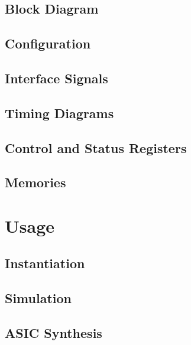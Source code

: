 \documentclass{ug}
\begin{document}
\subsection{Block Diagram}
\label{sec:bdd}


\ifdefined\CONFS
\subsection{Configuration}
\label{sec:ipconfig}

\fi

\subsection{Interface Signals}
\label{sec:ifsig}


\ifdefined\TD
\subsection{Timing Diagrams}
\label{sec:td}

\fi

\ifdefined\CSRS
\subsection{Control and Status Registers}
\label{sec:csrs}

\fi

\ifdefined\MEMS
\subsection{Memories}
\label{sec:mems}

\fi

\ifdefined\SECTIONCLEARPAGE
\clearpage
\fi
\section{Usage}

\subsection{Instantiation}
\label{sec:inst}


\subsection{Simulation}
\label{sec:tbbd}


\subsection{ASIC Synthesis}
\label{sec:synth}

\end{document}
